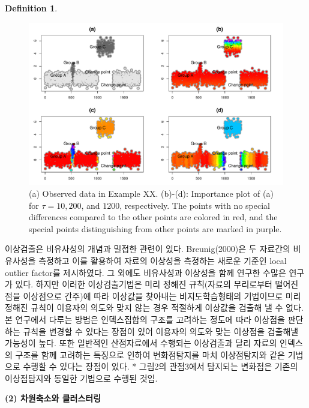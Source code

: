 \documentclass[preprint, review, 12pt]{article}
\theoremstyle{definition}
\newtheorem{dfn}{Definition}
\theoremstyle{remark}
\begin{document}
\begin{dfn}
\begin{figure}
\centering
\includegraphics[width=1\textwidth]{Fig/Fig3.pdf}
\caption{(a) Observed data in Example XX. (b)-(d): Importance plot of (a) for $\tau=10, 200$, and $1200$, respectively. The points with no special differences compared to the other points are colored in red, and the special points distinguishing from other points are marked in purple.}
\end{figure}

이상검출은 비유사성의 개념과 밀접한 관련이 있다. Breunig(2000)은 두 자료간의 비유사성을 측정하고 이를 활용하여 자료의 이상성을 측정하는 새로운 기준인 local outlier factor를 제시하였다. 그 외에도 비유사성과 이상성을 함께 연구한 수많은 연구가 있다. 하지만 이러한 이상검출기법은 미리 정해진 규칙(자료의 무리로부터 떨어진 점을 이상점으로 간주)에 따라 이상값을 찾아내는 비지도학습형태의 기법이므로 미리 정해진 규칙이 이용자의 의도와 맞지 않는 경우 적절하게 이상값을 검출해 낼 수 없다. 본 연구에서 다루는 방법은 인덱스집합의 구조를 고려하는 정도에 따라 이상점을 판단하는 규칙을 변경할 수 있다는 장점이 있어 이용자의 의도와 맞는 이상점을 검출해낼 가능성이 높다. 또한 일반적인 산점자료에서 수행되는 이상검출과 달리 자료의 인덱스의 구조를 함께 고려하는 특징으로 인하여 변화점탐지를 마치 이상점탐지와 같은 기법으로 수행할 수 있다는 장점이 있다.  
* 그림2의 관점3에서 탐지되는 변화점은 기존의 이상점탐지와 동일한 기법으로 수행된 것임.

\noindent\textbf{(2) 차원축소와 클러스터링}


\end{dfn}
\end{document}
